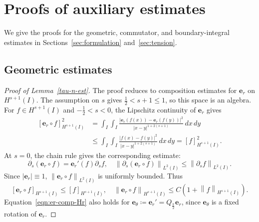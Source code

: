 \documentclass[11pt,reqno]{amsart}
\theoremstyle{plain}
\theoremstyle{definition}
\numberwithin{equation}{section}
\newcommand{\paren}[1]{\left(#1\right)}
\newcommand{\p}{\partial}
\newcommand{\bm}[1]{\boldsymbol{#1}}
\newcommand{\abs}[1]{\left\lvert #1 \right\rvert}
\newcommand{\norm}[1]{\left\lVert #1 \right\rVert}
\newcommand{\hi}[1]{H^{#1}(I)}
\begin{document}
\appendix

\section{Proofs of auxiliary estimates}
\label{app:operator-estimates}
\label{app:divided-differences}

We give the proofs for the geometric, commutator, and boundary-integral estimates in Sections~\ref{sec:formulation} and~\ref{sec:tension}.

\subsection{Geometric estimates}
\label{app:geometry-estimates}

\begin{proof}[Proof of Lemma~\ref{tau-n-est}]
The proof reduces to composition estimates for $\bm e_r$ on $H^{s+1}(I)$.
The assumption on $s$ gives $\frac{1}{2}<s+1\le1$, so this space is an
algebra. For $f\in H^{s+1}(I)$ and $-\frac{1}{2}<s<0$, the Lipschitz
continuity of $\bm e_r$ gives
\begin{equation}
\begin{aligned}
    [\bm e_r\circ f]_{\hi{s+1}}^2
    &= \int_I\int_I
    \frac{\abs{\bm e_r(f(x))-\bm e_r(f(y))}^2}
    {\abs{x-y}^{1+2(s+1)}}\,dx\,dy \\
    &\le \int_I\int_I
    \frac{\abs{f(x)-f(y)}^2}
    {\abs{x-y}^{1+2(s+1)}}\,dx\,dy
    = [f]_{\hi{s+1}}^2.
\end{aligned}
\end{equation}
At $s=0$, the chain rule gives the corresponding estimate:
\begin{equation}
    \p_s(\bm e_r\circ f)
    =\bm e_r'(f)\p_s f,
    \quad
    \norm{\p_s(\bm e_r\circ f)}_{L^2(I)}
    \le \norm{\p_s f}_{L^2(I)}.
\end{equation}
Since $\abs{\bm e_r}\equiv 1$,
$\norm{\bm e_r\circ f}_{L^2(I)}$ is uniformly bounded. Thus
\begin{equation}\label{eqn:er-comp-Hr}
    [\bm e_r\circ f]_{\hi{s+1}}
    \le [f]_{\hi{s+1}},
    \quad
    \norm{\bm e_r\circ f}_{\hi{s+1}}
    \le C\paren{1+\norm{f}_{\hi{s+1}}}.
\end{equation}
Equation~\eqref{eqn:er-comp-Hr} also holds for $\bm e_\theta\coloneqq\bm e_r'=Q_{\frac{\pi}{2}}\bm e_r$, since
$\bm e_\theta$ is a fixed rotation of $\bm e_r$.


\end{proof}
\end{document}
